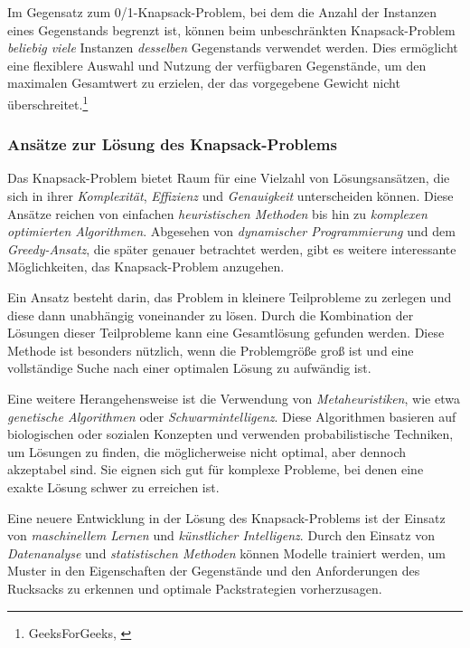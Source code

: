 Im Gegensatz zum 0/1-Knapsack-Problem, bei dem die Anzahl der Instanzen eines Gegenstands begrenzt ist, können beim
unbeschränkten Knapsack-Problem \textit{beliebig viele} Instanzen \textit{desselben} Gegenstands verwendet werden. Dies
ermöglicht eine flexiblere Auswahl und Nutzung der verfügbaren Gegenstände, um den maximalen Gesamtwert zu erzielen, der
das vorgegebene Gewicht nicht überschreitet.\footnote{GeeksForGeeks, \cite{Introduction to Knapsack Problem, its Types and How to solve them}}

\subsubsection{Ansätze zur Lösung des Knapsack-Problems}
Das Knapsack-Problem bietet Raum für eine Vielzahl von Lösungsansätzen, die sich in ihrer \textit{Komplexität}, \textit{Effizienz}
und \textit{Genauigkeit} unterscheiden können. Diese Ansätze reichen von einfachen \textit{heuristischen Methoden} bis
hin zu \textit{komplexen optimierten Algorithmen}. Abgesehen von \textit{dynamischer Programmierung} und dem \textit{Greedy-Ansatz},
die später genauer betrachtet werden, gibt es weitere interessante Möglichkeiten, das Knapsack-Problem anzugehen.

Ein Ansatz besteht darin, das Problem in kleinere Teilprobleme zu zerlegen und diese dann unabhängig voneinander zu lösen.
Durch die Kombination der Lösungen dieser Teilprobleme kann eine Gesamtlösung gefunden werden. Diese Methode ist besonders
nützlich, wenn die Problemgröße groß ist und eine vollständige Suche nach einer optimalen Lösung zu aufwändig ist.

Eine weitere Herangehensweise ist die Verwendung von \textit{Metaheuristiken}, wie etwa \textit{genetische Algorithmen}
oder \textit{Schwarmintelligenz}. Diese Algorithmen basieren auf biologischen oder sozialen Konzepten und verwenden
probabilistische Techniken, um Lösungen zu finden, die möglicherweise nicht optimal, aber dennoch akzeptabel sind. Sie
eignen sich gut für komplexe Probleme, bei denen eine exakte Lösung schwer zu erreichen ist.

Eine neuere Entwicklung in der Lösung des Knapsack-Problems ist der Einsatz von \textit{maschinellem Lernen} und \textit{künstlicher Intelligenz}.
Durch den Einsatz von \textit{Datenanalyse} und \textit{statistischen Methoden} können Modelle trainiert werden, um Muster
in den Eigenschaften der Gegenstände und den Anforderungen des Rucksacks zu erkennen und optimale Packstrategien vorherzusagen.

